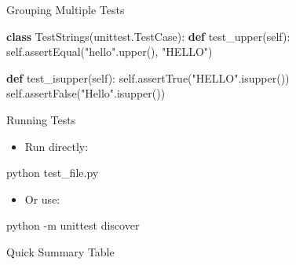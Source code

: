 \documentclass[
  letterpaper,
  DIV=11,
  numbers=noendperiod]{scrreprt}
\newenvironment{Shaded}{\begin{snugshade}}{\end{snugshade}}
\newcommand{\AttributeTok}[1]{\textcolor[rgb]{0.40,0.45,0.13}{#1}}
\newcommand{\ExtensionTok}[1]{\textcolor[rgb]{0.00,0.23,0.31}{#1}}
\newcommand{\KeywordTok}[1]{\textcolor[rgb]{0.00,0.23,0.31}{\textbf{#1}}}
\newcommand{\NormalTok}[1]{\textcolor[rgb]{0.00,0.23,0.31}{#1}}
\newcommand{\StringTok}[1]{\textcolor[rgb]{0.13,0.47,0.30}{#1}}
\newcommand{\VariableTok}[1]{\textcolor[rgb]{0.07,0.07,0.07}{#1}}
\providecommand{\tightlist}{%
  \setlength{\itemsep}{0pt}\setlength{\parskip}{0pt}}
\begin{document}
Grouping Multiple Tests

\begin{Shaded}
\begin{Highlighting}[]
\KeywordTok{class}\NormalTok{ TestStrings(unittest.TestCase):}
    \KeywordTok{def}\NormalTok{ test\_upper(}\VariableTok{self}\NormalTok{):}
        \VariableTok{self}\NormalTok{.assertEqual(}\StringTok{"hello"}\NormalTok{.upper(), }\StringTok{"HELLO"}\NormalTok{)}
    
    \KeywordTok{def}\NormalTok{ test\_isupper(}\VariableTok{self}\NormalTok{):}
        \VariableTok{self}\NormalTok{.assertTrue(}\StringTok{"HELLO"}\NormalTok{.isupper())}
        \VariableTok{self}\NormalTok{.assertFalse(}\StringTok{"Hello"}\NormalTok{.isupper())}
\end{Highlighting}
\end{Shaded}

Running Tests

\begin{itemize}
\tightlist
\item
  Run directly:
\end{itemize}

\begin{Shaded}
\begin{Highlighting}[]
\ExtensionTok{python}\NormalTok{ test\_file.py}
\end{Highlighting}
\end{Shaded}

\begin{itemize}
\tightlist
\item
  Or use:
\end{itemize}

\begin{Shaded}
\begin{Highlighting}[]
\ExtensionTok{python} \AttributeTok{{-}m}\NormalTok{ unittest discover}
\end{Highlighting}
\end{Shaded}

Quick Summary Table
\end{document}
